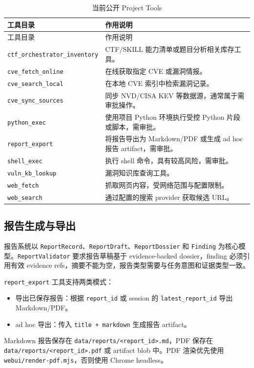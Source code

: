 \documentclass[UTF8,zihao=-4,a4paper,fontset=none]{ctexart}
\newcommand{\code}[1]{\texttt{\footnotesize #1}}
\begin{document}
\begin{longtable}{p{}p{}}
\caption{当前公开 Project Tools}\label{tab:tools}\\
\toprule
工具目录 & 作用说明 \\
\midrule
\endfirsthead
\toprule
工具目录 & 作用说明 \\
\midrule
\endhead
\code{ctf\_orchestrator\_inventory} & CTF/SKILL 能力清单或题目分析相关库存工具。 \\
\code{cve\_fetch\_online} & 在线获取指定 CVE 或漏洞情报。 \\
\code{cve\_search\_local} & 在本地 CVE 索引中检索漏洞记录。 \\
\code{cve\_sync\_sources} & 同步 NVD/CISA KEV 等数据源，通常属于需审批操作。 \\
\code{python\_exec} & 使用项目 Python 环境执行受控 Python 片段或脚本，需审批。 \\
\code{report\_export} & 将报告导出为 Markdown/PDF 或生成 ad hoc 报告 artifact，需审批。 \\
\code{shell\_exec} & 执行 shell 命令，具有较高风险，需审批。 \\
\code{vuln\_kb\_lookup} & 漏洞知识库查询工具。 \\
\code{web\_fetch} & 抓取网页内容，受网络范围与配置限制。 \\
\code{web\_search} & 通过配置的搜索 provider 获取候选 URL。 \\
\bottomrule
\end{longtable}

\subsection{报告生成与导出}

报告系统以 \code{ReportRecord}、\code{ReportDraft}、\code{ReportDossier} 和 \code{Finding} 为核心模型。\code{ReportValidator} 要求报告草稿基于 evidence-backed dossier，finding 必须引用有效 evidence refs，摘要不能为空，报告类型需要与任务意图和证据类型一致。

\code{report\_export} 工具支持两类模式：

\begin{itemize}
  \item 导出已保存报告：根据 \code{report\_id} 或 session 的 \code{latest\_report\_id} 导出 Markdown/PDF。
  \item ad hoc 导出：传入 \code{title + markdown} 生成报告 artifact。
\end{itemize}

Markdown 报告保存在 \code{data/reports/<report\_id>.md}，PDF 保存在 \code{data/reports/<report\_id>.pdf} 或 artifact blob 中。PDF 渲染优先使用 \code{webui/render-pdf.mjs}，否则使用 Chrome headless。
\end{document}
